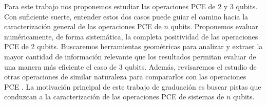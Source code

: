 Para este trabajo nos proponemos estudiar las operaciones PCE de 
2 y 3 qubits. Con suficiente suerte, entender estos dos casos
puede guiar el camino hacia la caracterización general de las operaciones
PCE de $n$ qubits. Proponemos evaluar numéricamente, de forma sistemática, 
la completa positividad de las operaciones PCE de 2 qubits. Buscaremos
herramientas geométricas para analizar y extraer la mayor cantidad de
información relevante que los resultados permitan evaluar de una manera
más eficiente el caso de 3 qubits. Además, revisaremos el 
estudio de otras operaciones de similar naturaleza para compararlos
con las operaciones PCE \cite{nathanson2007pauli}. 
La motivación principal de este trabajo de graduación 
es buscar pistas que conduzcan a la caracterización de las 
operaciones PCE de sistemas de $n$ qubits.